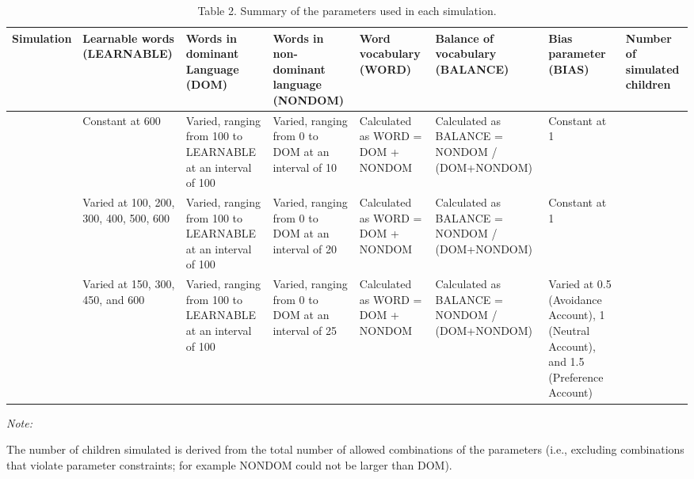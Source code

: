 \documentclass[
  english,
  ,man,floatsintext]{apa6}
\begin{document}
\begin{landscape}\begin{table}

\caption{\label{tab:table2}Table 2. Summary of the parameters used in each simulation.}
\centering
\fontsize{8}{10}\selectfont
\begin{threeparttable}
\begin{tabular}[t]{>{\centering\arraybackslash}p{45px}>{\raggedright\arraybackslash}p{45px}>{\raggedright\arraybackslash}p{75px}>{\raggedright\arraybackslash}p{75px}>{\raggedright\arraybackslash}p{75px}>{\raggedright\arraybackslash}p{75px}>{\raggedright\arraybackslash}p{75px}>{\raggedright\arraybackslash}p{45px}}
\toprule
Simulation & Learnable words (LEARNABLE) & Words in dominant Language (DOM) & Words in non-dominant language (NONDOM) & Word vocabulary (WORD) & Balance of vocabulary (BALANCE) & Bias parameter (BIAS) & Number of simulated children\\
\midrule
1 & Constant at 600 & Varied, ranging from 100 to LEARNABLE at an interval of 100 & Varied, ranging from 0 to DOM at an interval of 10 & Calculated as WORD = DOM + NONDOM & Calculated as BALANCE = NONDOM / (DOM+NONDOM) & Constant at 1 & 216\\
2 & Varied at 100, 200, 300, 400, 500, 600 & Varied, ranging from 100 to LEARNABLE at an interval of 100 & Varied, ranging from 0 to DOM at an interval of 20 & Calculated as WORD = DOM + NONDOM & Calculated as BALANCE = NONDOM / (DOM+NONDOM) & Constant at 1 & 301\\
3 & Varied at 150, 300, 450, and 600 & Varied, ranging from 100 to LEARNABLE at an interval of 100 & Varied, ranging from 0 to DOM at an interval of 25 & Calculated as WORD = DOM + NONDOM & Calculated as BALANCE = NONDOM / (DOM+NONDOM) & Varied at 0.5 (Avoidance Account), 1 (Neutral Account), and 1.5 (Preference Account) & 166\\
\bottomrule
\end{tabular}
\begin{tablenotes}
\item \textit{Note: } 
\item The number of children simulated is derived from the total number of allowed combinations of the parameters (i.e., excluding combinations that violate parameter constraints; for example NONDOM could not be larger than DOM).
\end{tablenotes}
\end{threeparttable}
\end{table}
\end{landscape}
\end{document}
